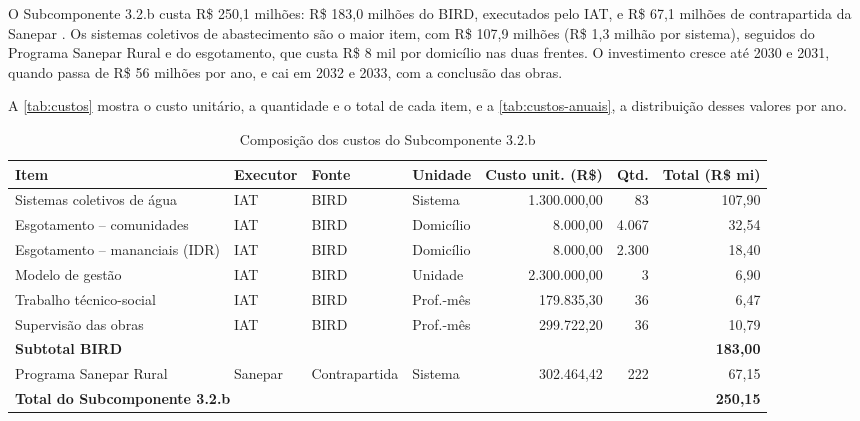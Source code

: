 O Subcomponente 3.2.b custa R\$ 250,1 milhões: R\$ 183,0 milhões do BIRD,
executados pelo IAT, e R\$ 67,1 milhões de contrapartida da Sanepar
\cite{custo2026}. Os sistemas coletivos de abastecimento são o maior item, com
R\$ 107,9 milhões (R\$ 1,3 milhão por sistema), seguidos do Programa Sanepar
Rural e do esgotamento, que custa R\$ 8 mil por domicílio nas duas frentes. O
investimento cresce até 2030 e 2031, quando passa de R\$ 56 milhões por ano, e
cai em 2032 e 2033, com a conclusão das obras.

A \autoref{tab:custos} mostra o custo unitário, a quantidade e o total de
cada item, e a \autoref{tab:custos-anuais}, a distribuição desses valores por
ano.

\begin{table}[H]
\centering
\caption{Composição dos custos do Subcomponente 3.2.b}
\label{tab:custos}
\footnotesize
\renewcommand{\arraystretch}{1.2}
\begin{adjustbox}{max width=\linewidth}
\begin{tabular}{llllrrr}
\toprule
\textbf{Item} & \textbf{Executor} & \textbf{Fonte} & \textbf{Unidade} &
\textbf{Custo unit. (R\$)} & \textbf{Qtd.} & \textbf{Total (R\$ mi)} \\
\midrule
Sistemas coletivos de água & IAT & BIRD & Sistema & 1.300.000,00 & 83 & 107,90 \\
Esgotamento -- comunidades & IAT & BIRD & Domicílio & 8.000,00 & 4.067 & 32,54 \\
Esgotamento -- mananciais (IDR) & IAT & BIRD & Domicílio & 8.000,00 & 2.300 & 18,40 \\
Modelo de gestão & IAT & BIRD & Unidade & 2.300.000,00 & 3 & 6,90 \\
Trabalho técnico-social & IAT & BIRD & Prof.-mês & 179.835,30 & 36 & 6,47 \\
Supervisão das obras & IAT & BIRD & Prof.-mês & 299.722,20 & 36 & 10,79 \\
\midrule
\multicolumn{6}{l}{\textbf{Subtotal BIRD}} & \textbf{183,00} \\
\midrule
Programa Sanepar Rural & Sanepar & Contrapartida & Sistema & 302.464,42 & 222 & 67,15 \\
\midrule
\multicolumn{6}{l}{\textbf{Total do Subcomponente 3.2.b}} & \textbf{250,15} \\
\bottomrule
\end{tabular}
\end{adjustbox}
\end{table}

